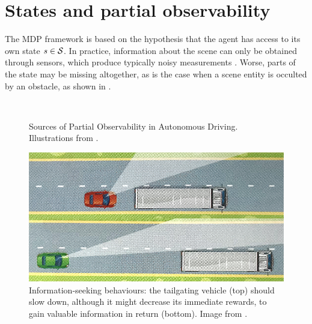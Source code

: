 \section{States and partial observability}

The MDP framework is based on the hypothesis that the agent has access to its own state $s\in\mathcal{S}$. In practice, information about the scene can only be obtained through sensors, which produce typically noisy measurements \citep{Ulbrich2013,Du2010}. Worse, parts of the state may be missing altogether, as is the case when a scene entity is occulted by an obstacle, as shown in . \citep{Brechtel2013,Bouton2018}


\begin{figure}[tp]
	\centering
	\\
	\caption{Sources of Partial Observability in Autonomous Driving. Illustrations from \citep{ObjCode2017}.}
	\label{fig:partial-observability}
\end{figure}
\begin{figure}
	\centering
	\includegraphics[width=0.7\linewidth]{img/pomdp}
	\caption{Information-seeking behaviours: the tailgating vehicle (top) should slow down, although it might decrease its immediate rewards, to gain valuable information in return (bottom). Image from \citep{ObjCode2017}.}
	\label{fig:information-seeking}
\end{figure}



